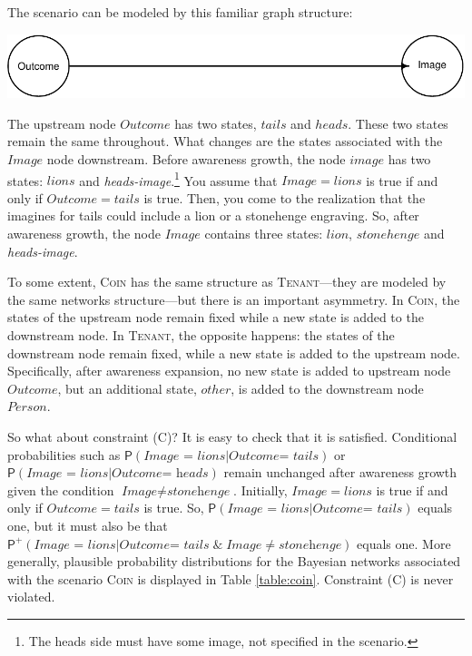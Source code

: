 \documentclass[
  11pt,
  dvipsnames,enabledeprecatedfontcommands, todos]{scrartcl}
\newcommand{\pr}[1]{\ensuremath{\mathsf{P}(#1)}}
\newcommand{\ppr}[2]{\ensuremath{\mathsf{P}^{#1}(#2)}}
\begin{document}
The scenario can be modeled by this familiar graph structure:

\begin{center}\includegraphics[width=0.5\linewidth,height=0.3\textheight]{ReplyToSteeleStefansson5_files/figure-latex/tailsDAG-1} \end{center}

\noindent The upstream node \(Outcome\) has two states, \(tails\) and
\(heads\). These two states remain the same throughout. What changes are
the states associated with the \(Image\) node downstream. Before
awareness growth, the node \(image\) has two states: \(lions\) and
\textit{heads-image}.\footnote{The heads side must have some image, not
  specified in the scenario.} You assume that \(Image=lions\) is true if
and only if \(Outcome=tails\) is true. Then, you come to the realization
that the imagines for tails could include a lion or a stonehenge
engraving. So, after awareness growth, the node \(Image\) contains three
states: \(lion\), \(stonehenge\) and \textit{heads-image}.

To some extent, \textsc{Coin} has the same structure as
\textsc{Tenant}---they are modeled by the same networks structure---but
there is an important asymmetry. In \textsc{Coin}, the states of the
upstream node remain fixed while a new state is added to the downstream
node. In \textsc{Tenant}, the opposite happens: the states of the
downstream node remain fixed, while a new state is added to the upstream
node. Specifically, after awareness expansion, no new state is added to
upstream node \(Outcome\), but an additional state, \(other\), is added
to the downstream node \(Person\).

So what about constraint (C)? It is easy to check that it is satisfied.
Conditional probabilities such as
\(\pr{\textit{Image = lions} \vert \textit{Outcome= tails}}\) or
\(\pr{\textit{Image = lions} \vert \textit{Outcome= heads}}\) remain
unchanged after awareness growth given the condition
\(\textit{Image} \neq \textit{stonehenge}\). Initially, \(Image=lions\)
is true if and only if \(Outcome=tails\) is true. So,
\(\pr{\textit{Image = lions} \vert \textit{Outcome= tails}}\) equals
one, but it must also be that
\(\ppr{+}{\textit{Image = lions} \vert \textit{Outcome= tails} \; \& \; \textit{Image} \neq \textit{stonehenge}}\)
equals one. More generally, plausible probability distributions for the
Bayesian networks associated with the scenario \textsc{Coin} is
displayed in Table \ref{table:coin}. Constraint (C) is never violated.
\end{document}

